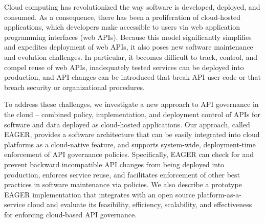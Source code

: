 Cloud computing has revolutionized the way software is
developed, deployed, and consumed.  As a consequence, there has been a
proliferation of cloud-hosted applications, which developers make accessible to users via
web application programming interfaces (web APIs).
Because this model significantly simplifies and expedites
deployment of web APIs, it also poses new software maintenance and evolution
challenges.  In particular, it becomes difficult to track, control, and compel
reuse of web APIs, inadequately tested services can be
deployed into production, and API changes can be introduced that
break API-user code or that breach security or organizational procedures.

To address these challenges, we investigate a new approach to API governance
in the cloud -- combined policy, implementation, and deployment control of APIs for
software and data deployed as cloud-hosted applications.  Our approach, called EAGER,
provides a software architecture that can be easily integrated into cloud
platforms as a cloud-native feature, and supports system-wide, 
deployment-time enforcement of API governance policies.
Specifically, EAGER can check for and
prevent backward incompatible API changes from
being deployed into production,
enforces service reuse, and facilitates enforcement of other best practices
in software maintenance via policies.  We also describe a prototype
EAGER implementation that
integrates with an open source platform-as-a-service cloud and
evaluate its feasibility, efficiency,
scalability, and effectiveness for enforcing cloud-based API governance.

